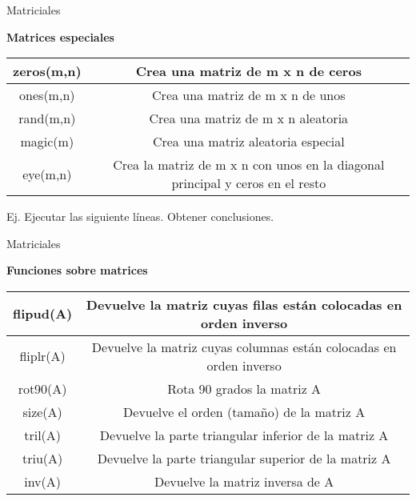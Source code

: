 \documentclass{bredelebeamer}
\begin{document}
\begin{frame}{Matriciales}
\begin{center}
\textbf{Matrices especiales}
\end{center}
\begin{table}[]
\centering
\begin{tabular}{|c|c|}
\hline
zeros(m,n) & Crea una matriz de m x n de ceros                                             \\ \hline
ones(m,n)  & Crea una matriz de m x n de unos                                              \\ \hline
rand(m,n)  & Crea una matriz de m x n aleatoria                                            \\ \hline
magic(m)   & Crea una matriz aleatoria especial                                            \\ \hline
eye(m,n)   & Crea la matriz de m x n con unos en la diagonal principal y ceros en el resto \\ \hline
\end{tabular}
\end{table}
Ej. Ejecutar las siguiente líneas. Obtener conclusiones.
\end{frame}

\begin{frame}{Matriciales}
\begin{center}
\textbf{Funciones sobre matrices}
\end{center}
\begin{table}[]
\centering
\begin{tabular}{|c|c|}
\hline
flipud(A) & Devuelve la matriz cuyas filas están colocadas en orden inverso    \\ \hline
fliplr(A) & Devuelve la matriz cuyas columnas están colocadas en orden inverso \\ \hline
rot90(A)  & Rota 90 grados la matriz A                                          \\ \hline
size(A)   & Devuelve el orden (tamaño) de la matriz A                          \\ \hline
tril(A)   & Devuelve la parte triangular inferior de la matriz A                \\ \hline
triu(A)   & Devuelve la parte triangular superior de la matriz A                \\ \hline
inv(A)    & Devuelve la matriz inversa de A                                     \\ \hline
\end{tabular}
\end{table}
\end{frame}
\end{document}
